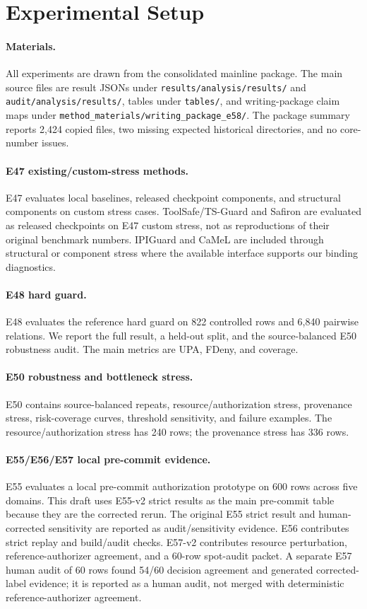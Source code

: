 \section{Experimental Setup}

\paragraph{Materials.}
All experiments are drawn from the consolidated mainline package. The main source files are result JSONs under \texttt{results/analysis/results/} and \texttt{audit/analysis/results/}, tables under \texttt{tables/}, and writing-package claim maps under \texttt{method\_materials/writing\_package\_e58/}. The package summary reports 2,424 copied files, two missing expected historical directories, and no core-number issues.

\paragraph{E47 existing/custom-stress methods.}
E47 evaluates local baselines, released checkpoint components, and structural components on custom stress cases. ToolSafe/TS-Guard and Safiron are evaluated as released checkpoints on E47 custom stress, not as reproductions of their original benchmark numbers. IPIGuard and CaMeL are included through structural or component stress where the available interface supports our binding diagnostics.

\paragraph{E48 hard guard.}
E48 evaluates the reference hard guard on 822 controlled rows and 6,840 pairwise relations. We report the full result, a held-out split, and the source-balanced E50 robustness audit. The main metrics are UPA, FDeny, and coverage.

\paragraph{E50 robustness and bottleneck stress.}
E50 contains source-balanced repeats, resource/authorization stress, provenance stress, risk-coverage curves, threshold sensitivity, and failure examples. The resource/authorization stress has 240 rows; the provenance stress has 336 rows.

\paragraph{E55/E56/E57 local pre-commit evidence.}
E55 evaluates a local pre-commit authorization prototype on 600 rows across five domains. This draft uses E55-v2 strict results as the main pre-commit table because they are the corrected rerun. The original E55 strict result and human-corrected sensitivity are reported as audit/sensitivity evidence. E56 contributes strict replay and build/audit checks. E57-v2 contributes resource perturbation, reference-authorizer agreement, and a 60-row spot-audit packet. A separate E57 human audit of 60 rows found 54/60 decision agreement and generated corrected-label evidence; it is reported as a human audit, not merged with deterministic reference-authorizer agreement.


